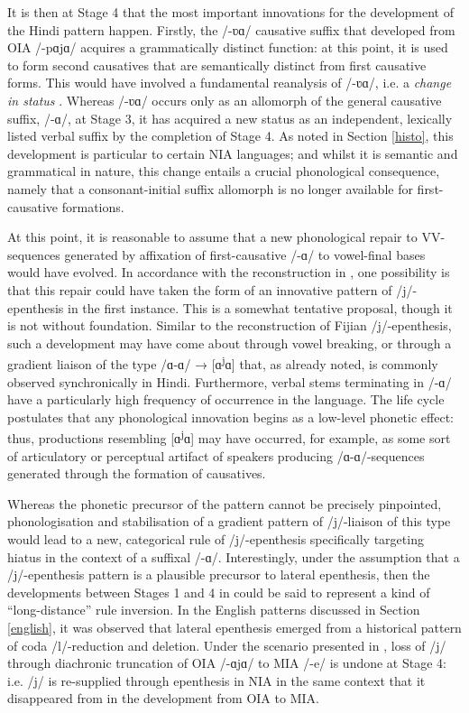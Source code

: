 \documentclass[output=paper,colorlinks,citecolor=brown]{langscibook}
\begin{document}
It is then at Stage 4 that the most important innovations for the development of the Hindi pattern happen.  Firstly, the /-ʋɑ/ causative suffix that developed from OIA /-pɑjɑ/ acquires a grammatically distinct function: at this point, it is used to form second causatives that are semantically distinct from first causative forms.  This would have involved a fundamental reanalysis of /-ʋɑ/, i.e. a \textit{change in status} \citep{Anderson1981}.  Whereas /-ʋɑ/ occurs only as an allomorph of the general causative suffix, /-ɑ/, at Stage 3, it has acquired a new status as an independent, lexically listed verbal suffix by the completion of Stage 4. As noted in Section \ref{histo}, this development is particular to certain NIA languages; and whilst it is semantic and grammatical in nature, this change entails a crucial phonological consequence, namely that a consonant-initial suffix allomorph is no longer available for first-causative formations.

At this point, it is reasonable to assume that a new phonological repair to VV-sequences generated by affixation of first-causative /-ɑ/ to vowel-final bases would have evolved.  In accordance with the reconstruction in , one possibility is that this repair could have taken the form of an innovative pattern of /j/-epenthesis in the first instance.  This is a somewhat tentative proposal, though it is not without foundation. Similar to the reconstruction of Fijian /j/-epenthesis, such a development may have come about through vowel breaking, or through a gradient liaison of the type /ɑ-ɑ/ → [ɑ\textsuperscript{j}ɑ] that, as already noted, is commonly observed synchronically in Hindi. Furthermore, verbal stems terminating in /-ɑ/ have a particularly high frequency of occurrence in the language.  The life cycle postulates that any phonological innovation begins as a low-level phonetic effect: thus, productions resembling [ɑ\textsuperscript{j}ɑ] may have occurred, for example, as some sort of articulatory or perceptual artifact of speakers producing /ɑ-ɑ/-sequences generated through the formation of causatives. 

Whereas the phonetic precursor of the pattern cannot be precisely pinpointed, phonologisation and stabilisation of a gradient pattern of /j/-liaison of this type would lead to a new, categorical rule of /j/-epenthesis specifically targeting hiatus in the context of a suffixal /-ɑ/.  Interestingly, under the assumption that a /j/-epenthesis pattern is a plausible precursor to lateral epenthesis, then the developments between Stages 1 and 4 in  could be said to represent a kind of ``long-distance'' rule inversion.  In the English patterns discussed in Section \ref{english}, it was observed that lateral epenthesis emerged from a historical pattern of coda /l/-reduction and deletion.  Under the scenario presented in , loss of /j/ through diachronic truncation of OIA /-ɑjɑ/ to MIA /-e/ is undone at Stage 4: i.e. /j/ is re-supplied through epenthesis in NIA in the same context that it disappeared from in the development from OIA to MIA.
\end{document}
